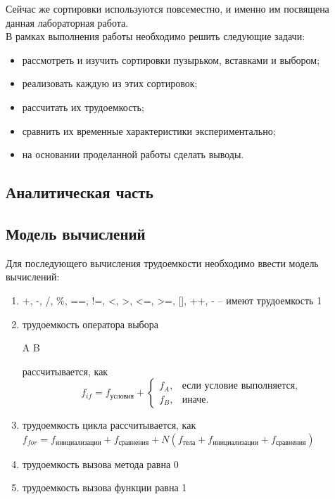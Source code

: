 \documentclass[a4paper,12pt]{article}
\begin{document}
		
		Сейчас же сортировки используются повсеместно, и именно им посвящена данная лабораторная работа.\\
В рамках выполнения работы необходимо решить следующие задачи:   
		\begin{itemize}
		    \item рассмотреть и изучить сортировки пузырьком, вставками и выбором;
			\item реализовать каждую из этих сортировок;
			\item рассчитать их трудоемкость; 				
			\item сравнить их временные характеристики экспериментально; 
			\item на основании проделанной работы сделать выводы.
		\end{itemize}
    \newpage

    \begin{center}
        \section{Аналитическая часть}
\subsection{Модель вычислений}
\end{center}


Для последующего вычисления трудоемкости необходимо ввести модель вычислений:
\begin{enumerate}
\item +, -, /, \%, ==, !=, <, >, <=, >=, [], ++, \-- -- имеют трудоемкость 1
\item трудоемкость оператора выбора
			\begin{algorithmic}
				\State A
			\Else
				\State B
			\EndIf
			\end{algorithmic}
 рассчитывается, как 
			\[ f_{if} = f_{\text{условия}} + 
			\begin{cases}
				f_A, & \text{если условие выполняется,}\\
				f_B, & \text{иначе.}
			\end{cases} \]
\item трудоемкость цикла рассчитывается, как $f_{for} = f_{\text{инициализации}} + f_{\text{сравнения}} + N(f_{\text{тела}} + f_{\text{инициализации}} + f_{\text{сравнения}})$
\item трудоемкость вызова метода равна 0
\item трудоемкость вызова функции равна 1
\end{enumerate}
\end{document}
